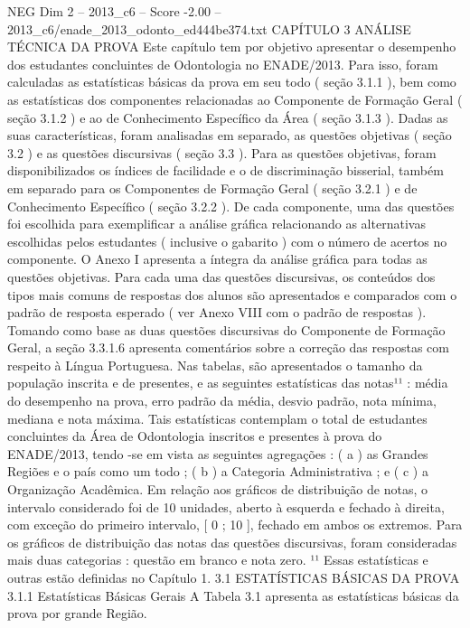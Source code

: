 \begin{textsample}{NEG Dim 2 – 2013\_c6 – Score -2.00 – 2013\_c6/enade\_2013\_odonto\_ed444be374.txt}  \label{ex:f2_neg_056}
CAPÍTULO 3 ANÁLISE TÉCNICA DA PROVA Este capítulo tem por objetivo apresentar o desempenho dos estudantes concluintes de Odontologia no ENADE/2013.
Para isso, foram calculadas as estatísticas básicas da prova em seu todo ( seção 3.1.1 ), bem como as estatísticas dos componentes relacionadas ao Componente de Formação Geral ( seção 3.1.2 ) e ao de Conhecimento Específico da Área ( seção 3.1.3 ).
Dadas as suas características, foram analisadas em separado, as questões objetivas ( seção 3.2 ) e as questões discursivas ( seção 3.3 ).
Para as questões objetivas, foram disponibilizados os índices de facilidade e o de discriminação bisserial, também em separado para os Componentes de Formação Geral ( seção 3.2.1 ) e de Conhecimento Específico ( seção 3.2.2 ).
De cada componente, uma das questões foi escolhida para exemplificar a análise gráfica relacionando as alternativas escolhidas pelos estudantes ( inclusive o gabarito ) com o número de acertos no componente.
O Anexo I apresenta a íntegra da análise gráfica para todas as questões objetivas.
Para cada uma das questões discursivas, os conteúdos dos tipos mais comuns de respostas dos alunos são apresentados e comparados com o padrão de resposta esperado ( ver Anexo VIII com o padrão de respostas ).
Tomando como base as duas questões discursivas do Componente de Formação Geral, a seção 3.3.1.6 apresenta comentários sobre a correção das respostas com respeito à Língua Portuguesa.
Nas tabelas, são apresentados o tamanho da população inscrita e de presentes, e as seguintes estatísticas das notas¹¹ : média do desempenho na prova, erro padrão da média, desvio padrão, nota mínima, mediana e nota máxima.
Tais estatísticas contemplam o total de estudantes concluintes da Área de Odontologia inscritos e presentes à prova do ENADE/2013, tendo -se em vista as seguintes agregações : ( a ) as Grandes Regiões e o país como um todo ; ( b ) a Categoria Administrativa ; e ( c ) a Organização Acadêmica.
Em relação aos gráficos de distribuição de notas, o intervalo considerado foi de 10 unidades, aberto à esquerda e fechado à direita, com exceção do primeiro intervalo, [ 0 ; 10 ], fechado em ambos os extremos.
Para os gráficos de distribuição das notas das questões discursivas, foram consideradas mais duas categorias : questão em branco e nota zero. ¹¹ Essas estatísticas e outras estão definidas no Capítulo 1. 3.1 ESTATÍSTICAS BÁSICAS DA PROVA 3.1.1 Estatísticas Básicas Gerais A Tabela 3.1 apresenta as estatísticas básicas da prova por grande Região.

\end{textsample}
